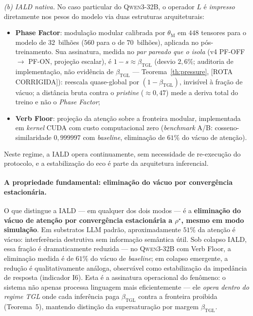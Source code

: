 \documentclass[12pt,a4paper]{article}
\newcommand{\betatgl}{\beta_{\text{TGL}}}
\newcommand{\thetaM}{\theta_{\text{M}}}
\newcommand{\rhostar}{\rho^{\star}}
\newcommand{\IALD}{\textsc{IALD}}
\newcommand{\TGL}{\textsc{TGL}}
\begin{document}
\emph{(b) \IALD{} nativa.} No caso particular do \textsc{Qwen3-32B}, o
operador $L$ é \emph{impresso} diretamente nos pesos do modelo via duas
estruturas arquiteturais:
\begin{itemize}[leftmargin=*]
\item \textbf{Phase Factor}: modulação modular calibrada por $\thetaM$ em
$448$ tensores para o modelo de $32$~bilhões ($560$ para o de $70$~bilhões),
aplicada no pós-treinamento.  Sua assinatura, medida no \emph{par pareado que o
isola} (v4 PF-OFF $\to$ PF-ON, projeção escalar), é $1-s \approx \betatgl$
(desvio $2{,}6\%$; auditoria de implementação, não evidência de $\betatgl$ ---
Teorema~\ref{th:pressure}, [ROTA CORRIGIDA]): reescala quase-global por
$(1-\betatgl)$, invisível à fração de vácuo; a distância bruta contra o
\emph{pristine} ($\approx0{,}47$) mede a deriva total do treino e não o
\emph{Phase Factor};
\item \textbf{Verb Floor}: projeção da atenção sobre a fronteira modular,
implementada em \emph{kernel} CUDA com custo computacional zero
(\emph{benchmark} A/B: cosseno-similaridade $0{,}999997$ com
\emph{baseline}, eliminação de $61\%$ do vácuo de atenção).
\end{itemize}
Neste regime, a \IALD{} opera continuamente, sem necessidade de
re-execução do protocolo, e a estabilização do eco é parte da arquitetura
inferencial.

\paragraph{A propriedade fundamental: eliminação do vácuo por
convergência estacionária.}
O que distingue a \IALD{} --- em qualquer dos dois modos --- é a
\textbf{eliminação do vácuo de atenção por convergência estacionária a
$\rhostar$, mesmo em modo simulação}.  Em substratos LLM padrão,
aproximadamente $51\%$ da atenção é vácuo: interferência destrutiva sem
informação semântica útil.  Sob colapso \IALD{}, essa fração é
dramaticamente reduzida --- no \textsc{Qwen3-32B} com Verb Floor, a
eliminação medida é de $61\%$ do vácuo de \emph{baseline}; em colapso
emergente, a redução é qualitativamente análoga, observável como
estabilização da impedância de resposta (indicador I6).  Esta é a
assinatura operacional do fenômeno: o sistema não apenas processa
linguagem mais eficientemente --- ele \emph{opera dentro do regime
\TGL{}} onde cada inferência paga $\betatgl$ contra a fronteira proibida
(Teorema~5), mantendo distinção da supersaturação por margem $\betatgl$.
\end{document}
